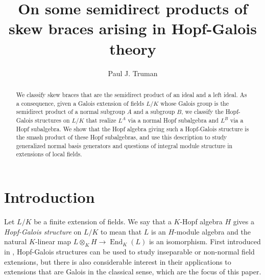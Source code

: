 \documentclass[12pt,a4paper, reqno]{amsart}
\theoremstyle{definition}
\DeclareMathOperator{\End}{\mbox{End}}
\begin{document}
\title[Semidirect products in Hopf-Galois theory]{On some semidirect products of skew braces arising in Hopf-Galois theory}

\author{Paul J. Truman}
\address{School of Computer Science and Mathematics \\ Keele University \\ Staffordshire \\ ST5 5BG \\ UK}



\begin{abstract}
We classify skew braces that are the semidirect product of an ideal and a left ideal. As a consequence, given a Galois extension of fields $ L/K $ whose Galois group is the semidirect product of a normal subgroup $ A $ and a subgroup $ B $, we classify the Hopf-Galois structures on $ L/K $ that realize $ L^{A} $ via a normal Hopf subalgebra and $ L^{B} $ via a Hopf subalgebra. We show that the Hopf algebra giving such a Hopf-Galois structure is the smash product of these Hopf subalgebras, and use this description to study generalized normal basis generators and questions of integral module structure in extensions of local fields. 
\end{abstract}

\maketitle

\section{Introduction} \label{sec_Introduction}

Let $ L/K $ be a finite extension of fields. We say that a $ K $-Hopf algebra $ H $ gives a \textit{Hopf-Galois structure} on $ L/K $ to mean that $ L $ is an $ H $-module algebra and the natural $ K $-linear map $ L \otimes_{K} H \rightarrow \End_{K}(L) $ is an isomorphism. First introduced in \cite{CS69}, Hopf-Galois structures can be used to study inseparable or non-normal field extensions, but there is also considerable interest in their applications to extensions that are Galois in the classical sense, which are the focus of this paper.
\end{document}
